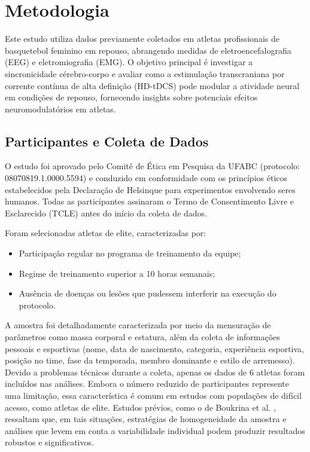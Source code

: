 \chapter{Metodologia}
\label{chap:metodologia}

Este estudo utiliza dados previamente coletados em atletas profissionais de basquetebol feminino em repouso, abrangendo medidas de eletroencefalografia (EEG) e eletromiografia (EMG). O objetivo principal é investigar a sincronicidade cérebro-corpo e avaliar como a estimulação transcraniana por corrente contínua de alta definição (HD-tDCS) pode modular a atividade neural em condições de repouso, fornecendo insights sobre potenciais efeitos neuromodulatórios em atletas.

\section{Participantes e Coleta de Dados}

O estudo foi aprovado pelo Comitê de Ética em Pesquisa da UFABC (protocolo: 08070819.1.0000.5594) e conduzido em conformidade com os princípios éticos estabelecidos pela Declaração de Helsinque para experimentos envolvendo seres humanos. Todas as participantes assinaram o Termo de Consentimento Livre e Esclarecido (TCLE) antes do início da coleta de dados.

Foram selecionadas atletas de elite, caracterizadas por:
\begin{itemize}
    \item Participação regular no programa de treinamento da equipe;
    \item Regime de treinamento superior a 10 horas semanais;
    \item Ausência de doenças ou lesões que pudessem interferir na execução do protocolo.
\end{itemize}

A amostra foi detalhadamente caracterizada por meio da mensuração de parâmetros como massa corporal e estatura, além da coleta de informações pessoais e esportivas (nome, data de nascimento, categoria, experiência esportiva, posição no time, fase da temporada, membro dominante e estilo de arremesso). Devido a problemas técnicos durante a coleta, apenas os dados de 6 atletas foram incluídos nas análises. Embora o número reduzido de participantes represente uma limitação, essa característica é comum em estudos com populações de difícil acesso, como atletas de elite. Estudos prévios, como o de Boukrina et al. \cite{boukrina2020considerations}, ressaltam que, em tais situações, estratégias de homogeneidade da amostra e análises que levem em conta a variabilidade individual podem produzir resultados robustos e significativos.

